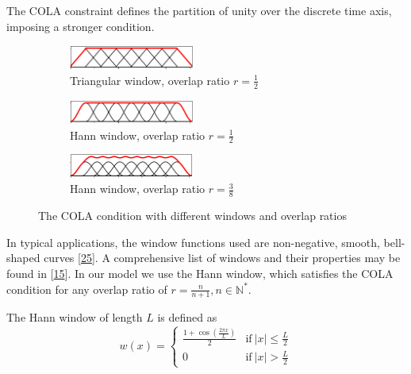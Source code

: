 \documentclass[american,]{article}
\theoremstyle{definition}
\theoremstyle{definition}
\theoremstyle{definition}
\theoremstyle{remark}
\begin{document}
The COLA constraint defines the partition of unity over the discrete time axis,
imposing a stronger condition.

\begin{figure}[H]
    \centering
    \begin{subfigure}[t]{\textwidth}
        \centering
        \includegraphics[width=0.45\textwidth]{img/woa_triangular_1_2.png}
        \caption{Triangular window, overlap ratio $r=\frac{1}{2}$}
    \end{subfigure}
    \begin{subfigure}[t]{\textwidth}
        \centering
        \includegraphics[width=0.45\textwidth]{img/woa_hann_1_2.png}
        \caption{Hann window, overlap ratio $r=\frac{1}{2}$}
    \end{subfigure}
    \begin{subfigure}[t]{\textwidth}
        \centering
        \includegraphics[width=0.45\textwidth]{img/woa_hann_3_8.png}
        \caption{Hann window, overlap ratio $r=\frac{3}{8}$}
    \end{subfigure}
    \caption{The COLA condition with different windows and overlap ratios}
\end{figure}

In typical applications, the window functions used are non-negative,
smooth, bell-shaped curves {[}\protect\hyperlink{ref-roads2002}{25}{]}.
A comprehensive list of windows and their properties may be found in {[}\protect\hyperlink{ref-heinzel2002}{15}{]}.
In our model we use the Hann window, which satisfies the COLA condition
for any overlap ratio of \(r=\frac{n}{n+1},n\in\mathbb{N}^*\).

The Hann window of length \(L\) is defined as
\begin{equation}
w(x)=\begin{cases}
\frac{1+\cos\left(\frac{2\pi x}{L}\right)}{2} & \text{if}~\left\lvert x\right\rvert\leq\frac{L}{2}\\
0 & \text{if}~\left\lvert x\right\rvert>\frac{L}{2}
\end{cases}
\end{equation}
\end{document}
